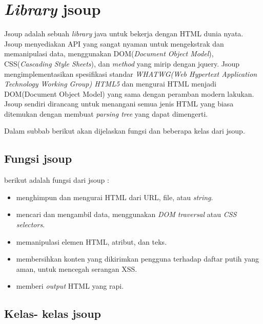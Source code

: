 \section{\textit{Library} jsoup}
\label{sec:libraryjsoup}

Jsoup adalah sebuah \textit{library} java untuk bekerja dengan HTML dunia nyata.  Jsoup menyediakan API yang sangat nyaman untuk mengekstrak dan memanipulasi data, menggunakan DOM(\textit{Document Object Model}), CSS(\textit{Cascading Style Sheets}), dan \textit{method} yang mirip dengan jquery. Jsoup mengimplementasikan spesifikasi standar \textit{WHATWG(\textit{Web Hypertext Application Technology Working Group}) HTML5} dan mengurai HTML menjadi DOM(Document Object Model) yang sama dengan peramban modern lakukan. Jsoup sendiri dirancang untuk menangani semua jenis HTML yang biasa ditemukan dengan membuat \textit{parsing tree} yang dapat dimengerti.

Dalam subbab berikut akan dijelaskan fungsi dan beberapa kelas dari jsoup\cite{jonathanhedley2016}.
\subsection{Fungsi jsoup}
\label{subsec:fungsijsoup}
berikut adalah fungsi dari jsoup :

\begin{itemize}
	\item menghimpun dan mengurai HTML dari URL, file, atau \textsl{string}.
	\item mencari dan mengambil data, menggunakan \textit{DOM traversal} atau \textit{CSS selectors}.
	\item memanipulasi elemen HTML, atribut, dan teks.
	\item membersihkan konten yang dikirimkan pengguna terhadap daftar putih yang aman, untuk mencegah serangan XSS.
	\item memberi \textit{output} HTML yang rapi.
\end{itemize}

\subsection{Kelas- kelas jsoup}
\label{subsec:jsoupclasses}

